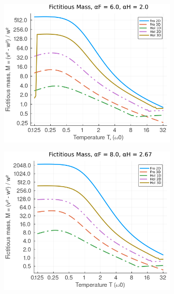 \begin{figure}[!tbp]
\begin{subfigure}[b]{0.49\textwidth}
    \includegraphics[width=\textwidth]{figures/mass_temp_6_2.png}
  \end{subfigure}
  \hfill
  \begin{subfigure}[b]{0.49\textwidth}
    \includegraphics[width=\textwidth]{figures/mass_temp_8_267.png}
  \end{subfigure}
  \begin{subfigure}[b]{0.49\textwidth}

\end{subfigure}
\end{figure}
